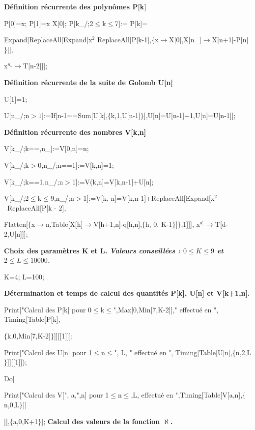 \noindent
{\bf 
D\'efinition r\'ecurrente des polyn\^omes P[k]
}
\medskip


\noindent
P[0]=x;
P[1]=x X[0]; P[k\_/;2$\le$k$\le$7]:=
P[k]=

\noindent
Expand[ReplaceAll[Expand[x$^2$ 
ReplaceAll[P[k-1],$\{$x$\rightarrow$X[0],X[n\_]$\rightarrow$X[n+1]-P[n]$\}$]],

\noindent
x$^{n\_}\rightarrow$T[n-2]]];
\medskip

\noindent
{\bf 
D\'efinition r\'ecurrente de la suite de Golomb U[n]
}
\medskip

\noindent
U[1]=1;

\noindent
U[n\_/;n$>1$]:=If[n-1==Sum[U[k],$\{$k,1,U[n-1]$\}$],U[n]=U[n-1]+1,U[n]=U[n-1]];
\medskip

\noindent
{\bf 
D\'efinition r\'ecurrente des nombres V[k,n]
}
\medskip

\noindent
V[k\_/;k==,n\_]:=V[0,n]=n;

\noindent
V[k\_/;k$>$0,n\_/;n==1]:=V[k,n]=1;

\noindent
V[k\_/;k==1,n\_/;n$>$1]:=V(k,n]=V[k,n-1]+U[n]; 

\noindent
V[k\_/;2$\le$k$\le9$,n\_/;n$>$1]:=V[k, n]=V[k,n-1]+ReplaceAll[Expand[x$^2$\  ReplaceAll[P[k - 2],

\noindent
Flatten[$\{$x$\rightarrow$n,Table[X[h]$\rightarrow$V[h+1,n]-q[h,n],$\{$h, 0, K-1$\}$]$\}$,1]]], x$^{d\_}\rightarrow$T[d-2,U[n]]];
\medskip

\noindent
{\bf
Choix des param\`etres K et L. 
{\it Valeurs conseill\'ees :  $0\le K\le 9$ et $2\le L\le10000$. }
}
\medskip

\noindent
K=4;
L=100;
\medskip

\noindent
{\bf 
D\'etermination et temps de calcul des quantit\'es P[k], U[n] et V[k+1,n]. 
}
\medskip

\noindent
Print["Calcul des P[k] pour 0$\le$k$\le$",Max[0,Min[7,K-2]]," effectu\'e en  ", 
Timing[Table[P[k],

\noindent
$\{$k,0,Min[7,K-2]$\}$]][[1]]];

\noindent
Print["Calcul des U[n] pour 1$\le$n$\le$", L, " effectu\'e en ",
Timing[Table[U[n],$\{$n,2,L$\}$]][[1]]);

\noindent
Do[

\noindent
Print["Calcul des V[", a,",n] pour 1$\le$n$\le$,L, effectu\'e en ",Timing[Table[V[a,n],$\{$n,0,L$\}$]]

\noindent
[[1]]],$\{$a,0,K+1$\}$];
\medskip
\noindent
{\bf 
Calcul des valeurs de la fonction $\aleph$. 
}
\medskip

